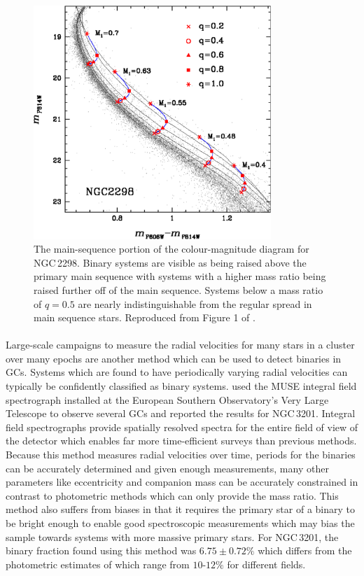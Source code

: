 \begin{figure}
	\centering
	\includegraphics[width=0.8\textwidth]{./figures/main_sequence_binaries.pdf}
	\caption{The main-sequence portion of the colour-magnitude diagram for NGC\,2298. Binary
		systems are visible as being raised above the primary main sequence with systems with a
		higher mass ratio being raised further off of the main sequence. Systems below a mass ratio
		of $q=0.5$ are nearly indistinguishable from the regular spread in main sequence stars.
		Reproduced from Figure 1 of \citet{Milone2012}.}
	\label{fig:1/main_sequence_binaries}
\end{figure}

\paragraph{}
Large-scale campaigns to measure the radial velocities for many stars in a cluster over many epochs
are another method which can be used to detect binaries in GCs. Systems which are found to have
periodically varying radial velocities can typically be confidently classified as binary systems.
\citet{Giesers2019} used the MUSE integral field spectrograph installed at the European Southern
Observatory's Very Large Telescope to observe several GCs and reported the results for NGC\,3201.
Integral field spectrographs provide spatially resolved spectra for the entire field of view of the
detector which enables far more time-efficient surveys than previous methods. Because this method
measures radial velocities over time, periods for the binaries can be accurately determined and
given enough measurements, many other parameters like eccentricity and companion mass can be
accurately constrained in contrast to photometric methods which can only provide the mass ratio.
This method also suffers from biases in that it requires the primary star of a binary to be bright
enough to enable good spectroscopic measurements which may bias the sample towards systems with more
massive primary stars. For NGC\,3201, the binary fraction found using this method was $6.75 \pm 0.72
	\%$ \citep{Giesers2019} which differs from the photometric estimates of \citet{Milone2012} which
range from $10\textrm{-}12\%$ for different fields.


